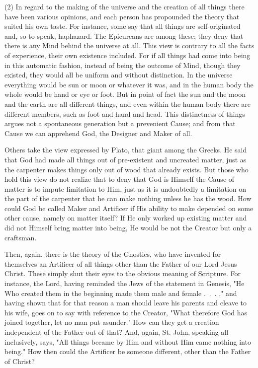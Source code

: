 \documentclass[9pt, twocolumn, oneside, a4paper]{memoir}
\begin{document}
\textsc{(2)} In regard to the making of the universe and the       creation of all things there have been various opinions, and each person has       propounded the theory that suited his own taste. For instance, some say that all       things are self-originated and, so to speak, haphazard. The Epicureans are among       these; they deny that there is any Mind behind the universe at all. This view is       contrary to all the facts of experience, their own existence included. For if       all things had come into being in this automatic fashion, instead of being the       outcome of Mind, though they existed, they would all be uniform and without       distinction. In the universe everything would be sun or moon or whatever it was,       and in the human body the whole would be hand or eye or foot. But in point of       fact the sun and the moon and the earth are all different things, and even       within the human body there are different members, such as foot and hand and       head. This distinctness of things argues not a spontaneous generation but a       prevenient Cause; and from that Cause we can apprehend God, the Designer and       Maker of all.   

Others take the view expressed by Plato, that giant among the Greeks. He said       that God had made all things out of pre-existent and uncreated matter, just as       the carpenter makes things only out of wood that already exists. But those who       hold this view do not realize that to deny that God is Himself the Cause of       matter is to impute limitation to Him, just as it is undoubtedly a limitation on       the part of the carpenter that he can make nothing unless he has the wood. How       could God be called Maker and Artificer if His ability to make depended on some       other cause, namely on matter itself? If He only worked up existing matter and       did not Himself bring matter into being, He would be not the Creator but only a       craftsman.   

Then, again, there is the theory of the Gnostics, who have invented for       themselves an Artificer of all things other than the Father of our Lord Jesus       Christ. These simply shut their eyes to the obvious meaning of Scripture. For       instance, the Lord, having reminded the Jews of the statement in Genesis, "He Who created them in the beginning made them      male       and female . . . ," and having shown that for that reason a man should leave       his parents and cleave to his wife, goes on to say with reference to the       Creator, "What therefore God has joined together, let no man put asunder."       How       can they get a creation independent of the Father out of that? And, again, St.       John, speaking all inclusively, says,       "All things became by Him and without Him came nothing       into being."       How then could the Artificer be someone different, other than the Father of Christ?   
\end{document}
